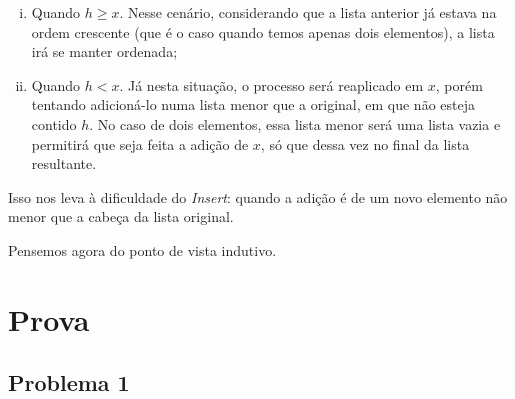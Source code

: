 \documentclass[a4paper, 10pt]{article}
\begin{document}
\begin{enumerate}[i)]
	\item Quando $h \geq x$. Nesse cenário, considerando que a lista anterior já estava na ordem crescente (que é o caso quando temos apenas dois elementos), a lista irá se manter ordenada;
    \item Quando $h < x$. Já nesta situação, o processo será reaplicado em $x$, porém tentando adicioná-lo numa lista menor que a original, em que não esteja contido $h$. No caso de dois elementos, essa lista menor será uma lista vazia e permitirá que seja feita a adição de $x$, só que dessa vez no final da lista resultante.
\end{enumerate}

Isso nos leva à dificuldade do \textit{Insert}: quando a adição é de um novo elemento não menor que a cabeça da lista original. 

Pensemos agora do ponto de vista indutivo. 



\section{Prova}

\subsection{Problema 1}
\end{document}
